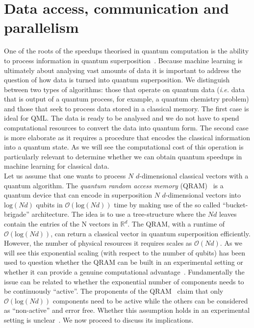 \documentclass[a4paper, 11pt]{article}
\newcommand{\Ord}[1]{\mathcal{O}(#1)}
\begin{document}
\section{Data access, communication and parallelism}
\label{sec:data}

One of the roots of the speedups theorised in quantum computation is the ability to process information in quantum superposition~\cite{nielsen2010quantum,aaronson2013quantum}. Because machine learning is ultimately about analysing vast amounts of data it is important to address the question of how data is turned into quantum superposition. We distinguish between two types of algorithms: those that operate on quantum data (\textit{i.e.} data that is output of a quantum process, for example, a quantum chemistry problem) and those that seek to process data stored in a classical memory. The first case is ideal for QML. The data is ready to be analysed and we do not have to spend computational resources to convert the data into quantum form. The second case is more elaborate as it requires a procedure that encodes the classical information into a quantum state. As we will see the computational cost of this operation is particularly relevant to determine whether we can obtain quantum speedups in machine learning for classical data.\\

Let us assume that one wants to process $N$ $d$-dimensional classical vectors with a quantum algorithm. The \textit{quantum random access memory} (QRAM)~\cite{giovannetti2008qram1,giovannetti2008qram2} is  a quantum device that can encode in superposition $N$ $d$-dimensional vectors into $\mathrm{log}(Nd)$ qubits in $\mathcal{O}(\mathrm{log}(Nd))$ time by making use of the so called ``bucket-brigade'' architecture. 
The idea is to use a tree-structure where the $Nd$ leaves contain the entries of the N vectors in $\mathbb{R}^d$. The QRAM, with a runtime of  $\Ord{\mathrm{log}(Nd)}$, can return a classical vector in quantum superposition efficiently. However, the number of physical resources it requires scales as $\Ord{Nd}$. As we will see this exponential scaling (with respect to the number of qubits) has been used to question whether the QRAM can be built in an experimental setting or whether it can provide a genuine computational advantage~\cite{aaronson2015read,adcock2015advances}. Fundamentally the issue can be related to whether the exponential number of components needs to be continuously ``active''. The proponents of the QRAM~\cite{giovannetti2008qram1,giovannetti2008qram2} claim that only $\Ord{\mathrm{log}(Nd)}$ components need to be active while the others can be considered as ``non-active'' and error free. Whether this assumption holds in an experimental setting is unclear~\cite{arunachalam2015robustness}. We now proceed to discuss its implications.\\
\end{document}
